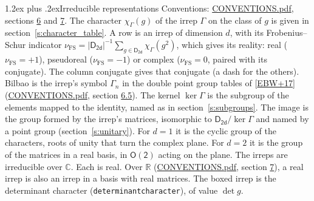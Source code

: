 \documentclass[10pt,a4paper]{article}
\makeatletter
\renewcommand\section{\@startsection{section}{1}{\z@}{-3ex plus -1ex minus -.2ex}%
  {1.2ex plus .2ex}{\normalfont\large\sffamily\bfseries\color{parttitle}}}
\numberwithin{equation}{section}
\newcommand{\grp}[1]{\mathsf{#1}}
\newcommand{\irchar}[1]{\chi_{#1}}
\newcommand{\fsind}{\nu_{\mathrm{FS}}}
\makeatother
\begin{document}
\section{Irreducible representations}\label{s:irreps}
Conventions: \href{../../CONVENTIONS.pdf}{CONVENTIONS.pdf}, sections \href{../../CONVENTIONS.pdf\#conv.6}{6} and \href{../../CONVENTIONS.pdf\#conv.7}{7}.
\leavevmode\label{n:function.character}\label{n:irrep.Gamma}The character $\irchar{\Gamma}(g)$ of the irrep $\Gamma$ on the class of $g$ is given in section~\ref{s:character_table}.
\leavevmode\label{n:index.dimension}\label{n:index.frobenius}\label{n:head.irrep}\label{n:head.reality}A row is an irrep of dimension $d$, with its Frobenius--Schur indicator $\fsind = |\grp{D_{2d}}|^{-1}\allowbreak\sum_{g\in\grp{D_{2d}}}\irchar{\Gamma}(g^2)$, which gives its reality: real ($\fsind = +1$), pseudoreal ($\fsind = -1$) or complex ($\fsind = 0$, paired with its conjugate). \label{n:head.conjugate}The column conjugate gives that conjugate (a dash for the others). \label{n:head.bilbao}\label{n:irrep.alias.gamma}Bilbao is the irrep's symbol $\Gamma_n$ in the double point group tables of [\href{../../../REFERENCES.pdf\#ref.EBW+17}{EBW+17}] (\href{../../CONVENTIONS.pdf}{CONVENTIONS.pdf}, section \href{../../CONVENTIONS.pdf\#conv.6.5}{6.5}). \label{n:head.kernel}The kernel $\ker\Gamma$ is the subgroup of the elements mapped to the identity, named as in section~\ref{s:subgroups}. \label{n:head.image}The image is the group formed by the irrep's matrices, isomorphic to $\grp{D_{2d}}/\ker\Gamma$ and named by a point group (section~\ref{s:unitary}). For $d = 1$ it is the cyclic group of the characters, roots of unity that turn the complex plane. For $d = 2$ it is the group of the matrices in a real basis, in $\grp{O(2)}$ acting on the plane. The irreps are irreducible over $\mathbb{C}$. Each is real. Over $\mathbb{R}$ (\href{../../CONVENTIONS.pdf}{CONVENTIONS.pdf}, section \href{../../CONVENTIONS.pdf\#conv.7}{7}), a real irrep is also an irrep in a basis with real matrices. \label{n:mark.determinant}The boxed irrep is the determinant character (\texttt{determinantcharacter}), of value $\det g$.
\setlength{\emergencystretch}{2em}\par\setlength{\emergencystretch}{0pt}
\end{document}
